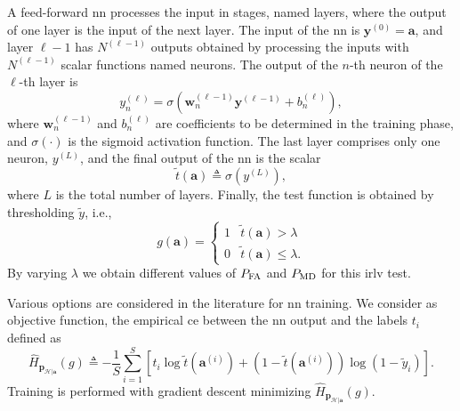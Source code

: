 \documentclass[conference,final]{IEEEtran}
\newcommand{\hatcross}[2]{\hat{H}_{#1}(#2)}
\begin{document}
A feed-forward \ac{nn} processes the input in stages, named layers, where the output of one layer is the input of the next layer. The input of the \ac{nn} is $\bm{y}^{(0)} = \bm{a}$, and layer $\ell-1$ has $N^{(\ell-1)}$ outputs obtained by processing the inputs with $N^{(\ell-1)}$ scalar functions named neurons. The output of the $n$-th neuron of the $\ell$-th layer is
\begin{equation}\label{eq:nonLin}
y_n^{(\ell)} = \sigma\left( \bm{w}_n^{(\ell -1)}\bm{y}^{(\ell-1)}+b_n^{(\ell)} \right),
\end{equation}
where $\bm{w}_n^{(\ell -1)}$ and $b_n^{(\ell)}$ are coefficients to be determined in the training phase, and $\sigma(\cdot)$ is the sigmoid activation function. 
The last layer comprises only one neuron, $y^{(L)}$, and the final output of the \ac{nn} is the scalar 
\begin{equation}
	\tilde{t}(\bm a) \triangleq \sigma(y^{(L)}),	
\end{equation}
where $L$ is the total number of layers. Finally, the test function is obtained by thresholding $\tilde{y}$, i.e.,
\begin{equation}
\label{eq:decNN}
    g(\bm{a}) = \begin{cases}
    1 & \tilde{t}(\bm a) > \lambda \\
    0 & \tilde{t}(\bm a) \leq \lambda.
    \end{cases}
\end{equation}
By varying $\lambda$ we obtain different values of $P_{\rm FA}$ and $P_{\rm MD}$ for this \ac{irlv} test.

Various options are considered in the literature for \ac{nn} training. We consider as objective function, the empirical \ac{ce} between the \ac{nn} output and the labels $t_i$ defined as
\begin{equation}\label{eq:ce}
\hatcross{\bm p_{\mathcal{H}|\bm a}}{g} \triangleq -\frac{1}{S} \sum_{i=1}^{S}\left[t_i\log \tilde{t}(\bm a^{(i)}) +\left(1-\tilde{t}(\bm a^{(i)})\right)\log\left(1-\tilde{y}_i\right)\right].
\end{equation}
Training is performed with gradient descent minimizing $\hatcross{\bm p_{\mathcal{H}|\bm a}}{g}$.
\end{document}
